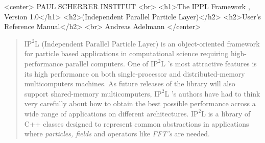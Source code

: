 \documentclass[12pt,a4paper]{report}
\newcommand{\ipplversion}{\text{1.0 }}
\newcommand{\ippl}{\textsc{I$\text{P}^2$L }}
\begin{document}
\begin{titlepage}

\begin{htmlonly}
\begin{rawhtml}
<center>
PAUL SCHERRER INSTITUT
<br>
<h1>The IPPL Framework , Version 1.0</h1>
<h2>(Independent Parallel Particle Layer)</h2>
<h2>User's Reference Manual</h2>
<br>
Andreas Adelmann  
</center>
\end{rawhtml}
\end{htmlonly}

\begin{quotation}
 \ippl (Independent Parallel Particle Layer) is an object-oriented framework for particle based applications in computational science 
requiring high-performance parallel computers. One of \ippl 's most attractive features is its high performance on both single-processor and  distributed-memory multicomputers machines. As future releases of the library will also support shared-memory multicomputers, \ippl 's authors have had to think very carefully about how to obtain the best possible performance across a wide range of applications on different architectures.
\ippl  is a library of C++ classes designed to represent common abstractions in applications where {\em particles, fields} and operators like {\em FFT's} are needed.


\end{quotation}
\end{titlepage}
\end{document}
